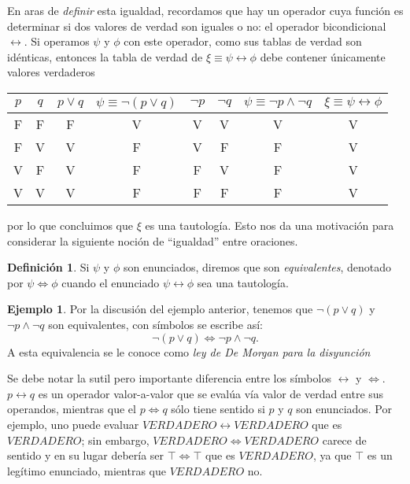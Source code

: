 \documentclass{book}
\theoremstyle{definition}
\newtheorem{df}{Definición}[chapter]
\newtheorem{ejm}{Ejemplo}[chapter]
\begin{document}
En aras de \emph{definir} esta igualdad,  recordamos que hay un operador cuya función es determinar si dos valores de verdad son iguales o no: el operador bicondicional $\leftrightarrow$.
Si operamos $\psi$ y $\phi$ con este operador, como sus tablas de verdad son idénticas, entonces la tabla de verdad de $\xi \equiv \psi \leftrightarrow \phi$ debe contener únicamente valores verdaderos
\begin{center}\begin{tabular}{|c|c||c|c|c|c|c|c|}
		\hline
		$p$ & $q$ & $p\vee q$ & $\psi \equiv \neg (p \vee q)$ & $\neg p$ & $\neg q$ & $\psi \equiv \neg p \wedge \neg q$ & $\xi \equiv \psi \leftrightarrow \phi$ \\
		\hline\hline
		F & F & F & V & V & V & V & V \\ \hline
		F & V & V & F & V & F & F & V \\ \hline
		V & F & V & F & F & V & F & V \\ \hline
		V & V & V & F & F & F & F & V \\ \hline
\end{tabular}\end{center}
por lo que concluimos que $\xi$ es una tautología.
Esto nos da una motivación para considerar la siguiente noción de ``igualdad'' entre oraciones.
\begin{df}\label{df_equivalenciaLogica}
	Si $\psi$ y $\phi$ son enunciados, diremos que son \emph{equivalentes}, denotado por $\psi \iff \phi$ cuando el enunciado $\psi \leftrightarrow \phi$ sea una tautología.
\end{df}

\begin{ejm}
	Por la discusión del ejemplo anterior, tenemos que $\neg (p \vee q)$ y $\neg p \wedge \neg q$ son equivalentes, con símbolos se escribe así: \[\neg (p \vee q) \iff \neg p \wedge \neg q.\]
	A esta equivalencia se le conoce como \emph{ley de De Morgan para la disyunción}
\end{ejm}

Se debe notar la sutil pero importante diferencia entre los símbolos $\leftrightarrow$ y $\iff$.
$p\leftrightarrow q$ es un operador valor-a-valor que se evalúa vía valor de verdad entre sus operandos, mientras que el $p\iff q$ sólo tiene sentido si $p$ y $q$ son enunciados.
Por ejemplo, uno puede evaluar $VERDADERO \leftrightarrow VERDADERO$ que es $VERDADERO$; sin embargo, $VERDADERO \iff VERDADERO$ carece de sentido y en su lugar debería ser $\top \iff \top$ que es $VERDADERO$, ya que $\top$ es un legítimo enunciado, mientras que $VERDADERO$ no.
\end{document}
